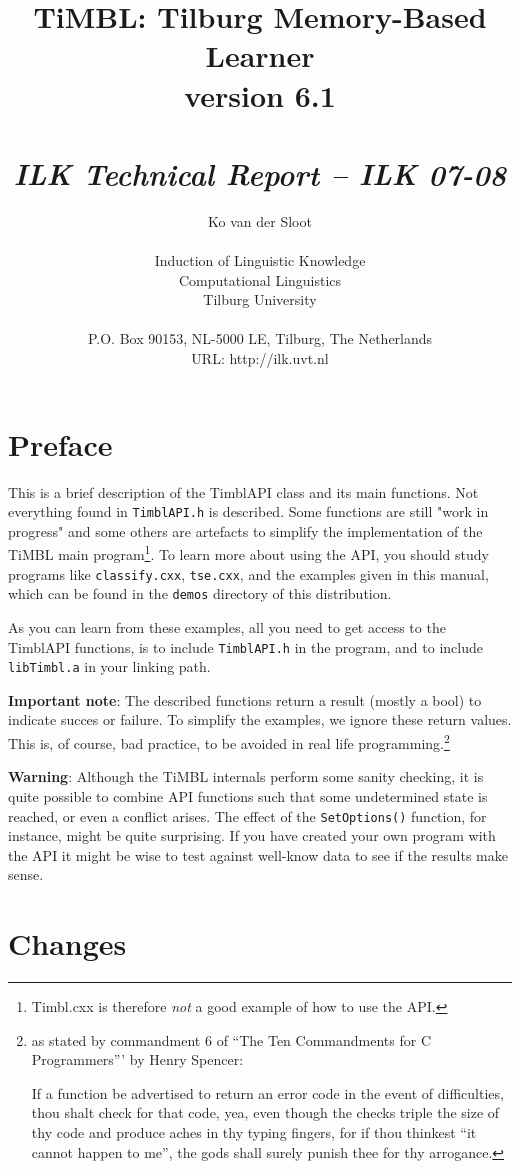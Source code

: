 \documentclass{report}
\author{Ko van der Sloot\\ \ \\ Induction of Linguistic Knowledge\\
        Computational Linguistics\\ Tilburg University \\ \ \\
        P.O. Box 90153, NL-5000 LE, Tilburg, The Netherlands \\ URL:
        http://ilk.uvt.nl}
\title{{\huge TiMBL: Tilburg Memory-Based Learner} \\ \vspace*{0.5cm}
{\bf version 6.1} \\ \vspace*{0.5cm}{\huge API Reference Guide}\\
\vspace*{1cm} {\it ILK Technical Report -- ILK 07-08}}
\begin{document}
\maketitle

\tableofcontents

\chapter*{Preface}

This is a brief description of the TimblAPI class and its main
functions.  Not everything found in {\tt TimblAPI.h} is
described. Some functions are still "work in progress" and some others
are artefacts to simplify the implementation of the TiMBL main
program\footnote{Timbl.cxx is therefore {\em not} a good example of
  how to use the API.}.  To learn more about using the API, you should
study programs like {\tt classify.cxx}, {\tt tse.cxx}, and the
examples given in this manual, which can be found in the {\tt demos}
directory of this distribution.

As you can learn from these examples, all you need to get access to the
TimblAPI functions, is to include {\tt TimblAPI.h} in the program, and to
include {\tt libTimbl.a} in your linking path. 

{\bf Important note}: The described functions return a result (mostly
a bool) to indicate succes or failure. To simplify the examples, we
ignore these return values. This is, of course, bad practice, to be avoided in
real life programming.\footnote{as stated by commandment 6 of ``The
  Ten Commandments for C Programmers''' by Henry Spencer:	

If a function be advertised to return an error code in the event of
difficulties, thou shalt check for that code, yea, even though the
checks triple the size of thy code and produce aches in thy typing
fingers, for if thou thinkest ``it cannot happen to me'', the gods
shall surely punish thee for thy arrogance.}

{\bf Warning}: Although the TiMBL internals perform some sanity
checking, it is quite possible to combine API functions such
that some undetermined state is reached, or even a conflict
arises. The effect of the {\tt SetOptions()} function, for instance,
might be quite surprising. If you have created your own program
with the API it might be wise to test against well-know data to see if
the results make sense.

\chapter{Changes}
\label{changes}
\end{document}
